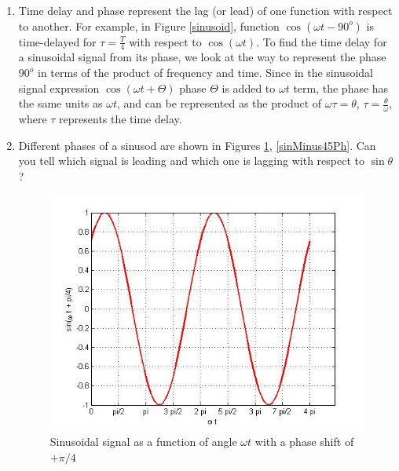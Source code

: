 \documentclass{ximera}
\begin{document}
\begin{enumerate}
\item Time delay and phase represent the lag (or lead) of one function with respect to another. For example, in Figure \ref{sinusoid}, function $ \cos(\omega t - 90^o)$ is time-delayed for $\tau = \frac{T}{4}$ with respect to $\cos (\omega t)$. To find the time delay for a sinusoidal signal from its phase, we look at the way to represent the phase $90^o$ in terms of the product of frequency and time. Since in the sinusoidal signal expression $\cos (\omega t + \Theta)$  phase $\Theta$ is added to $\omega t$ term, the phase has the same units as $\omega t$, and can be represented as the product of $\omega \tau = \theta$, $\tau = \frac{\theta}{\omega}$, where $\tau$ represents the time delay.


\item Different phases of a sinusod are shown in Figures \ref{sinPlus45Ph}, \ref{sinMinus45Ph}. Can you tell which signal is leading and which one is lagging with respect to $\sin{\theta}$?



\begin{figure}[htbp]
\includegraphics[scale=0.4]{jpg/cpef5.jpg}
\caption{Sinusoidal signal as a function of angle $\omega t$ with a phase shift of $+\pi/4$}
\label{sinPlus45Ph}
\end{figure}



\end{enumerate}
\end{document}
